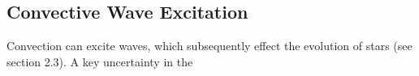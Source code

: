 {\color{purple}
\subsection{Convective Wave Excitation}
}

Convection can excite waves, which subsequently effect the evolution of stars (see section 2.3). A key uncertainty in the 
